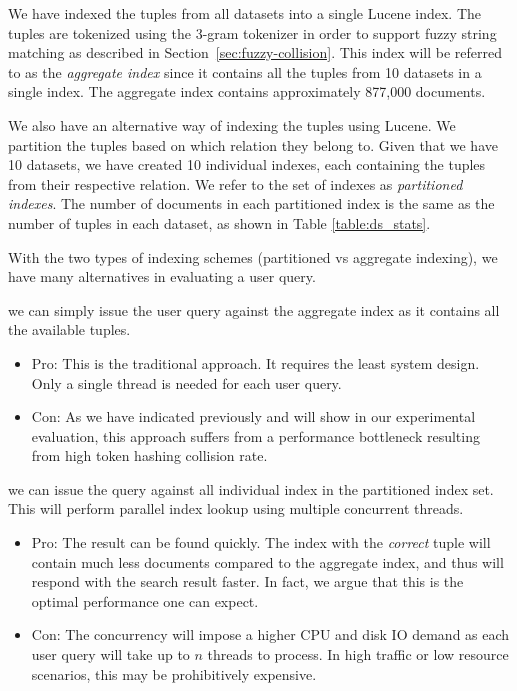 \documentclass[conference]{IEEEtran}
\begin{document}
We have indexed the tuples from all datasets into a single Lucene index.  The tuples are tokenized  using the 3-gram tokenizer in order to support fuzzy string matching as described in Section~\ref{sec:fuzzy-collision}.  This index will be referred to as the {\em aggregate index} since it contains all the tuples from 10 datasets in a single index.  The aggregate index contains approximately 877,000 documents.

We also have an alternative way of indexing the tuples using Lucene.  We partition the tuples based on which relation they belong to.  Given that we have 10 datasets, we have created 10 individual indexes, each containing the tuples from their respective relation.  We refer to the set of indexes as {\em partitioned indexes}.
The number of documents in each partitioned index is the same as the number of tuples in each dataset, as shown in Table \ref{table:ds_stats}.

With the two types of indexing schemes (partitioned vs aggregate indexing), we have many alternatives in evaluating a user query.

 we can simply issue the user query against the aggregate index as it contains all the available tuples.  

\begin{itemize}
    \item Pro: This is the traditional approach. It requires the least system design. Only a single thread is needed for each user query.
    \item Con: As we have indicated previously and will show in our experimental evaluation, this approach suffers from a performance bottleneck resulting from high token hashing collision rate.
\end{itemize}

 we can issue the query against all individual index in the partitioned index set.  This will perform parallel index lookup using multiple concurrent threads.

\begin{itemize}
    \item Pro: The result can be found quickly.  The index with the {\em correct} tuple will contain much less documents compared to the aggregate index, and thus will respond with the search result faster.  In fact, we argue that this is the optimal performance one can expect.
    \item Con: The concurrency will impose a higher CPU and disk IO demand as each user query will take up to $n$ threads to process.  In high traffic or low resource scenarios, this may be prohibitively expensive.
\end{itemize}
\end{document}
